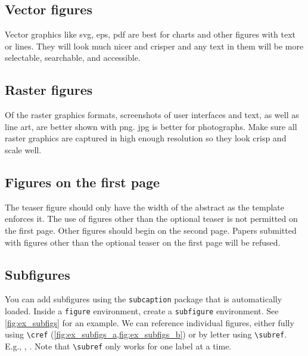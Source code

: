 \documentclass[journal]{vgtc}                     %
\begin{document}
\subsection{Vector figures}

Vector graphics like svg, eps, pdf are best for charts and other figures with text or lines.
They will look much nicer and crisper and any text in them will be more selectable, searchable, and accessible.

\subsection{Raster figures}

Of the raster graphics formats, screenshots of user interfaces and text, as well as line art, are better shown with png.
jpg is better for photographs.
Make sure all raster graphics are captured in high enough resolution so they look crisp and scale well.

\subsection{Figures on the first page}

The teaser figure should only have the width of the abstract as the template enforces it.
The use of figures other than the optional teaser is not permitted on the first page.
Other figures should begin on the second page.
Papers submitted with figures other than the optional teaser on the first page will be refused.

\subsection{Subfigures}

You can add subfigures using the \texttt{subcaption} package that is automatically loaded.
Inside a \verb|figure| environment, create a \verb|subfigure| environment.
See \cref{fig:ex_subfigs} for an example.
We can reference individual figures, either fully using \verb|\cref| (\cref{fig:ex_subfigs_a,fig:ex_subfigs_b}) or by letter using \verb|\subref|.
E.g., , .
Note that \verb|\subref| only works for one label at a time.
\end{document}
